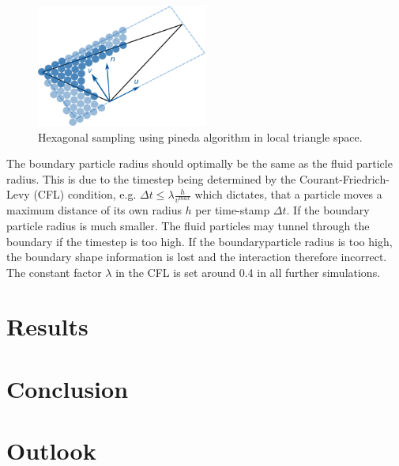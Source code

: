 \documentclass[11pt, letterpaper, twocolumn]{article}
\begin{document}
\begin{figure}[ht]
    \centering
    \includegraphics[width=0.5\textwidth]{images/triangle.pdf}
    \caption{Hexagonal sampling using pineda algorithm in local triangle space.}
    \label{fig:triangle}
\end{figure}


The boundary particle radius should optimally be the same as the fluid particle radius. This is due to the timestep being determined by the Courant-Friedrich-Levy (CFL) condition, e.g. \( \Delta t \leq \lambda \frac{h}{v^{max}}\) which dictates, that a particle moves a maximum distance of its own radius \(h\) per time-stamp \(\Delta t \). If the boundary particle radius is much smaller. The fluid particles may tunnel through the boundary if the timestep is too high. If the boundaryparticle radius is too high, the boundary shape information is lost and the interaction therefore incorrect. The constant factor \(\lambda\) in the CFL is set around 0.4 in all further simulations.





\section*{Results}
\label{sec:results}


\section*{Conclusion}
\label{sec:conclusion}



\section*{Outlook}
\label{sec:future}

\end{document}
